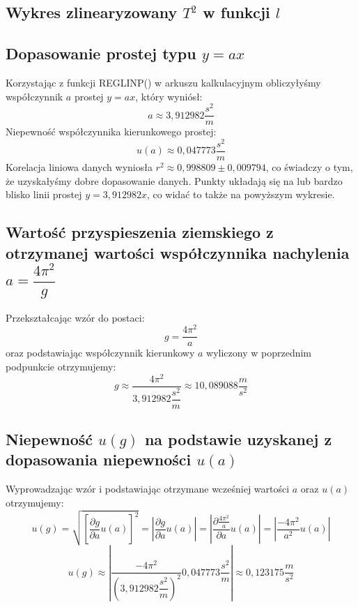 \documentclass[a4paper,11pt]{article}
\begin{document}
\subsection{Wykres zlinearyzowany $T^{2}$ w funkcji $l$} 

\begin{center}
\end{center}
\subsection{Dopasowanie prostej typu $y = ax$}
Korzystając z funkcji REGLINP() w arkuszu kalkulacyjnym obliczyłyśmy współczynnik $a$ prostej $y = ax$, który wyniósł:
$$a \approx 3,912982 \dfrac{s^{2}}{m}$$
Niepewność współczynnika kierunkowego prostej:
$$u(a)\approx 0,047773 \dfrac{s^{2}}{m}$$
Korelacja liniowa danych wyniosła $r^{2}\approx 0,998809 \pm 0,009794$, co świadczy o tym, że uzyskałyśmy dobre dopasowanie danych. Punkty układają się na lub bardzo blisko linii prostej $y=3,912982x$, co widać to także na powyższym wykresie.
\subsection{Wartość przyspieszenia ziemskiego z otrzymanej wartości współczynnika nachylenia $a =\dfrac{4\pi^{2}}{g}$}
Przekształcając wzór do postaci:
$$g = \dfrac{4\pi^{2}}{a}$$
oraz podstawiając współczynnik kierunkowy $a$ wyliczony w poprzednim podpunkcie otrzymujemy:
$$g \approx \dfrac{4\pi^{2}}{3,912982\dfrac{s^{2}}{m}} \approx 10,089088\dfrac{m}{s^{2}}$$
\subsection{Niepewność $u(g)$ na podstawie uzyskanej z dopasowania niepewności $u(a)$}
Wyprowadzając wzór i podstawiając otrzymane wcześniej wartości $a$ oraz $u(a)$ otrzymujemy: 
$$u(g)=\sqrt{\left[\frac{\partial g}{\partial a}u(a)\right]^{2}}=\left|\frac{\partial g}{\partial a}u(a)\right|=\left|\frac{\partial\frac{4\pi^{2}}{a}}{\partial a}u(a)\right|=\left|\frac{-4\pi^{2}}{a^{2}}u(a)\right|$$
$$u(g)\approx\left|\frac{-4\pi^{2}}{ \left(3,912982 \dfrac{s^{2}}{m}\right)^{2}}0,047773 \dfrac{s^{2}}{m}\right| \approx 0,123175\dfrac{m}{s^{2}}$$
\end{document}
